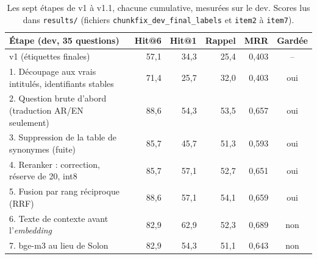 \begin{table}[H]
\centering
\small
\begin{tabular}{p{7.2cm}rrrrc}
\toprule
Étape (dev, 35 questions) & Hit@6 & Hit@1 & Rappel & MRR & Gardée \\
\midrule
v1 (étiquettes finales) & 57{,}1 & 34{,}3 & 25{,}4 & 0{,}403 & -- \\
1. Découpage aux vrais intitulés, identifiants stables & 71{,}4 & 25{,}7 & 32{,}0 & 0{,}403 & oui \\
2. Question brute d'abord (traduction AR/EN seulement) & 88{,}6 & 54{,}3 & 53{,}5 & 0{,}657 & oui \\
3. Suppression de la table de synonymes (fuite) & 85{,}7 & 45{,}7 & 51{,}3 & 0{,}593 & oui \\
4. Reranker : correction, réserve de 20, int8 & 85{,}7 & 57{,}1 & 52{,}7 & 0{,}651 & oui \\
5. Fusion par rang réciproque (RRF) & 88{,}6 & 57{,}1 & 54{,}1 & 0{,}659 & oui \\
6. Texte de contexte avant l'\emph{embedding} & 82{,}9 & 62{,}9 & 52{,}3 & 0{,}689 & non \\
7. bge-m3 au lieu de Solon & 82{,}9 & 54{,}3 & 51{,}1 & 0{,}643 & non \\
\bottomrule
\end{tabular}
\caption{Les sept étapes de v1 à v1.1, chacune cumulative, mesurées sur le dev. Scores lus dans \texttt{results/} (fichiers \texttt{chunkfix\_dev\_final\_labels} et \texttt{item2} à \texttt{item7}).}
\label{tab:steps}
\end{table}
